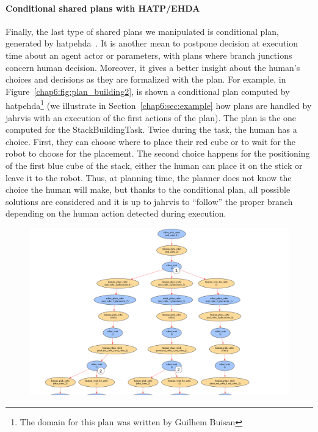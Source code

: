 \documentclass[a4paper,11pt,twoside]{StyleThese}
\begin{document}
\paragraph{Conditional shared plans with HATP/EHDA}
Finally, the last type of shared plans we manipulated is conditional plan, generated by \acrfull{hatpehda}~\cite{buisan_2021_human}. It is another mean to postpone decision at execution time about an agent actor or parameters, with plans where branch junctions concern human decision. Moreover, it gives a better insight about the human's choices and decisions as they are formalized with the plan. For example, in Figure~\ref{chap6:fig:plan_building2}, is shown a conditional plan computed by \acrshort{hatpehda}\footnote{The domain for this plan was written by Guilhem Buisan} (we illustrate in Section~\ref{chap6:sec:example} how plans are handled by \acrshort{jahrvis} with an execution of the first actions of the plan). The plan is the one computed for the StackBuildingTask. Twice during the task, the human has a choice. First, they can choose where to place their red cube or to wait for the robot to choose for the placement. The second choice happens for the positioning of the first blue cube of the stack, either the human can place it on the stick or leave it to the robot. Thus, at planning time, the planner does not know the choice the human will make, but thanks to the conditional plan, all possible solutions are considered and it is up to \acrshort{jahrvis} to ``follow'' the proper branch depending on the human action detected during execution.

\begin{landscape}
	\thispagestyle{example}
	\begin{figure}[!hp]
		\centering
		\includegraphics[scale=0.35]{figures/chapter2/plan_building.png}
	\end{figure}
\end{landscape}
\end{document}
